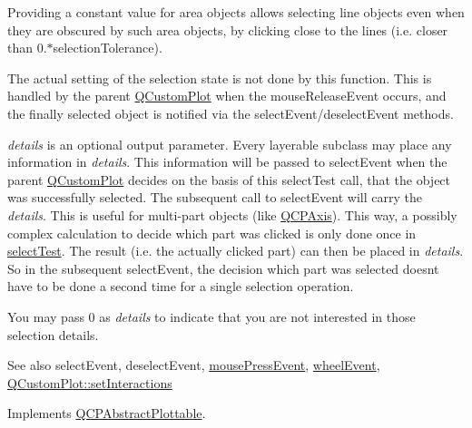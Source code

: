 Providing a constant value for area objects allows selecting line objects even when they are obscured by such area objects, by clicking close to the lines (i.\+e. closer than 0.$\ast$selection\+Tolerance).

The actual setting of the selection state is not done by this function. This is handled by the parent \hyperlink{class_q_custom_plot}{Q\+Custom\+Plot} when the mouse\+Release\+Event occurs, and the finally selected object is notified via the select\+Event/deselect\+Event methods.

{\itshape details} is an optional output parameter. Every layerable subclass may place any information in {\itshape details}. This information will be passed to select\+Event when the parent \hyperlink{class_q_custom_plot}{Q\+Custom\+Plot} decides on the basis of this select\+Test call, that the object was successfully selected. The subsequent call to select\+Event will carry the {\itshape details}. This is useful for multi-\/part objects (like \hyperlink{class_q_c_p_axis}{Q\+C\+P\+Axis}). This way, a possibly complex calculation to decide which part was clicked is only done once in \hyperlink{class_q_c_p_error_bars_ac1b6675ef43e32547a3cbcf7b7ac46ed}{select\+Test}. The result (i.\+e. the actually clicked part) can then be placed in {\itshape details}. So in the subsequent select\+Event, the decision which part was selected doesn\textquotesingle{}t have to be done a second time for a single selection operation.

You may pass 0 as {\itshape details} to indicate that you are not interested in those selection details.

\begin{DoxySeeAlso}{See also}
select\+Event, deselect\+Event, \hyperlink{class_q_c_p_layerable_af6567604818db90f4fd52822f8bc8376}{mouse\+Press\+Event}, \hyperlink{class_q_c_p_layerable_a47dfd7b8fd99c08ca54e09c362b6f022}{wheel\+Event}, \hyperlink{class_q_custom_plot_a5ee1e2f6ae27419deca53e75907c27e5}{Q\+Custom\+Plot\+::set\+Interactions} 
\end{DoxySeeAlso}


Implements \hyperlink{class_q_c_p_abstract_plottable_a38efe9641d972992a3d44204bc80ec1d}{Q\+C\+P\+Abstract\+Plottable}.

\mbox{\label{class_q_c_p_error_bars_ab3821460f7226d80e300d4a2c9baace8}} 
